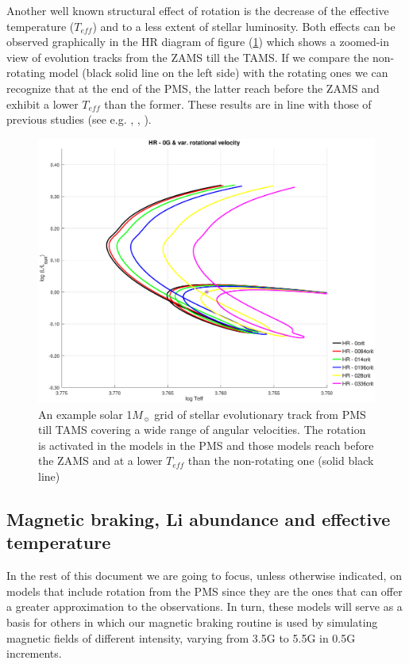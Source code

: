 \documentclass[fleqn,usenatbib]{mnras}
\begin{document}
Another well known structural effect of rotation is the decrease of the effective temperature ($T_{eff}$) and to a less extent of stellar luminosity. Both effects can be observed graphically in the HR diagram of figure (\ref{fig:hr_var_vel_0g}) which shows a zoomed-in view of evolution tracks from the ZAMS till the TAMS. If we compare the non-rotating model (black solid line on the left side) with the rotating ones we can recognize that at the end of the PMS, the latter reach before the ZAMS and exhibit a lower $T_{eff}$ than the former. These results are in line with those of previous studies (see e.g. \citet{Eggenberger2012}, \citet{Piau2001}, \citet{Pinsonneault1989}).\par


\begin{figure}
	\includegraphics[trim = 30mm 15mm 20mm 15mm, clip,width=\columnwidth]{figures/hr_var_vel_0_0g_z1.eps}
    \caption{An example solar 1$M_{\sun}$ grid of stellar evolutionary track from PMS till TAMS covering a wide range of angular velocities. The rotation is activated in the models in the PMS and those models reach before the ZAMS and at a lower $T_{eff}$ than the non-rotating one (solid black line)}
    \label{fig:hr_var_vel_0g}
\end{figure}

\subsection{Magnetic braking, Li abundance and effective temperature}
In the rest of this document we are going to focus, unless otherwise indicated, on models that include rotation from the PMS since they are the ones that can offer a greater approximation to the observations. In turn, these models will serve as a basis for others in which our magnetic braking routine is used by simulating magnetic fields of different intensity, varying from 3.5G to 5.5G in 0.5G increments.\par
\end{document}
